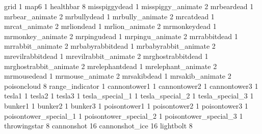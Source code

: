 grid 1
map6 1
healthbar 8
misspiggydead 1
misspiggy_animate 2
mrbeardead 1
mrbear_animate 2
mrbullydead 1
mrbully_animate 2
mrcatdead 1
mrcat_animate 2
mrliondead 1
mrlion_animate 2
mrmonkeydead 1
mrmonkey_animate 2
mrpingudead 1
mrpingu_animate 2
mrrabbitdead 1
mrrabbit_animate 2
mrbabyrabbitdead 1
mrbabyrabbit_animate 2
mrevilrabbitdead 1
mrevilrabbit_animate 2
mrghostrabbitdead 1
mrghostrabbit_animate 2
mrelephantdead 1
mrelephant_animate 2
mrmousedead 1
mrmouse_animate 2
mrsakibdead 1
mrsakib_animate 2
poisoncloud 8
range_indicator 1
cannontower1 1
cannontower2 1
cannontower3 1
tesla1 1
tesla2 1
tesla3 1
tesla_special_1 1
tesla_special_2 1
tesla_special_3 1
bunker1 1
bunker2 1
bunker3 1
poisontower1 1
poisontower2 1
poisontower3 1
poisontower_special_1 1
poisontower_special_2 1
poisontower_special_3 1
throwingstar 8
cannonshot 16
cannonshot_ice 16
lightbolt 8
